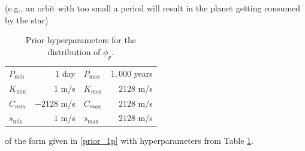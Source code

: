 \documentclass[aoas]{imsart}
\begin{document}
(e.g., an orbit with too small a period will result in the planet
getting consumed by the star) \citep{bullard2009edc}
\begin{table}[h]
  \begin{center}
  \begin{tabular}{|lr|lr|} \hline \hline
$P_{\min}$ &  $1$ day &
$P_{\max}$ &  $1,000$ years \\
$K_{\min}$ &  $ 1$ m/s & 
$K_{\max}$ &  $2128$ m/s \\
$C_{min}$ &  $-2128$ m/s & 
$C_{max}$ &   $2128$ m/s \\
$s_{\min}$ &  $1$ m/s &
$s_{\max}$ &  $2128$ m/s \\ \hline
  \end{tabular}
  \end{center}
\caption{Prior hyperparameters for the distribution of $\phi_p$.}
\label{tab:hyper}
\end{table}
 of the form given in \ref{prior_1p}
with hyperparameters from Table \ref{tab:hyper}.
\end{document}
